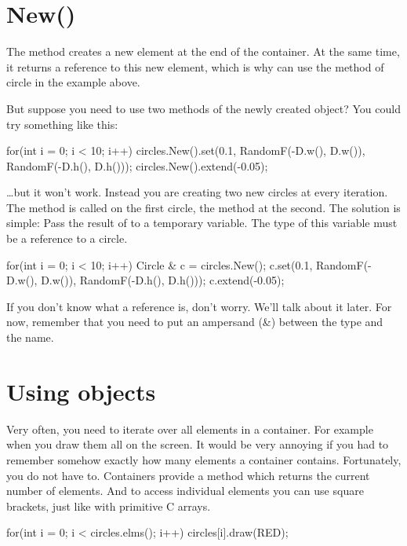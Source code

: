 \section{New()}
The method  creates a new element at the end of the container. At the same time, it returns a reference to this new element, which is why can use the  method of circle in the example above. 

But suppose you need to use two methods of the newly created object? You could try something like this:

\begin{code}
for(int i = 0; i < 10; i++)
{
	circles.New().set(0.1, RandomF(-D.w(), D.w()), RandomF(-D.h(), D.h()));
	circles.New().extend(-0.05);
}
\end{code}

\ldots but it won't work. Instead you are creating two new circles at every iteration. The method  is called on the first circle, the method  at the second. The solution is simple: Pass the result of  to a temporary variable. The type of this variable must be a reference to a circle. 

\begin{code}
for(int i = 0; i < 10; i++)
{
	Circle & c = circles.New();
	c.set(0.1, RandomF(-D.w(), D.w()), RandomF(-D.h(), D.h()));
	c.extend(-0.05);
}
\end{code}

\begin{note}
If you don't know what a reference is, don't worry. We'll talk about it later. For now, remember that you need to put an ampersand (\&) between the type and the name.
\end{note}

\section{Using objects}
Very often, you need to iterate over all elements in a container. For example when you draw them all on the screen. It would be very annoying if you had to remember somehow exactly how many elements a container contains. Fortunately, you do not have to. Containers provide a method  which returns the current number of elements. And to access individual elements you can use square brackets, just like with primitive C arrays.

\begin{code}
for(int i = 0; i < circles.elms(); i++)
{
  circles[i].draw(RED);
}
\end{code}


